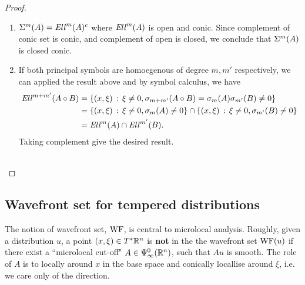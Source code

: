 \documentclass[12pt]{article}
\begin{document}
\begin{proof}
\begin{enumerate}
        \item $\Sigma^m(A) = \mathit{Ell}^m(A)^c$ where $\mathit{Ell}^m(A)$ is open and conic. Since complement of conic set is conic, and complement of open is closed, we conclude that $\Sigma^m(A)$ is closed conic. 
        
        
        \item If both principal symbols are homoegenous of degree $m, m'$ respectively, we can applied the result above and by symbol calculus, we have
        \begin{align*}
            \mathit{Ell}^{m + m'}(A \circ B) 
            & = \left\{(x, \xi) \, : \, \xi \neq 0, \sigma_{m + m'}(A \circ B) = \sigma_m(A) \sigma_{m'}(B) \neq 0\right\}\\
            & = \left\{(x, \xi) \, : \, \xi \neq 0, \sigma_m(A)  \neq 0\right\} \cap  \left\{(x, \xi) \, : \, \xi \neq 0, \sigma_{m'}(B)  \neq 0\right\} \\
            & = \mathit{Ell}^m(A) \cap \mathit{Ell}^{m'}(B). 
        \end{align*}
        Taking complement give the desired result. \\
        \\
    \end{enumerate}
    
\end{proof}



\subsection{Wavefront set for tempered distributions}
The notion of wavefront set, $\mathrm{WF}$,  is central to microlocal analysis. Roughly, given a distribution $u$, a point $(x, \xi) \in T^*{\mathbb R}^n$ is \textbf{not} in the the wavefront set $\mathrm{WF}(u)$ if there exist a ``microlocal cut-off" $A \in \Psi^{0}_{\infty}({\mathbb R}^n)$, 
such that $A u $ is smooth. The role of $A$ is to locally around $x$ in the base space and conically locallise around $\xi$, i.e. we care only of the direction. 
\begin{center}
\end{center}
\end{document}
